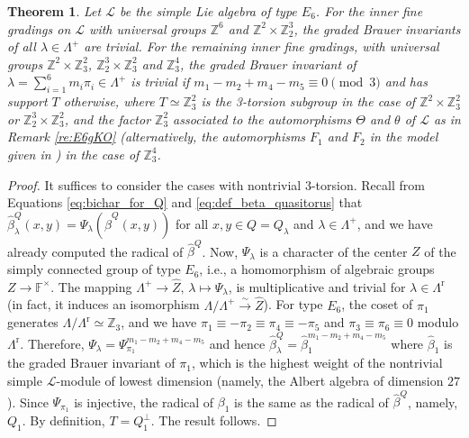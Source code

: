 \documentclass[a4paper,reqno]{amsart}
\newtheorem{theorem}{Theorem}
\theoremstyle{definition}
\numberwithin{theorem}{section}
\numberwithin{equation}{section}
\begin{document}
\begin{theorem}\label{th:E6_inner}
Let ${\mathcal{L}}$ be the simple Lie algebra of type $E_6$. For the inner fine gradings on ${\mathcal{L}}$ with universal groups ${\mathbb{Z}}^6$ and ${\mathbb{Z}}^2\times{\mathbb{Z}}_2^3$, the graded Brauer invariants of all $\lambda\in\Lambda^+$ are trivial. For the remaining inner fine gradings, with universal groups ${\mathbb{Z}}^2\times{\mathbb{Z}}_3^2$, ${\mathbb{Z}}_2^3\times{\mathbb{Z}}_3^2$ and ${\mathbb{Z}}_3^4$, the graded Brauer invariant of $\lambda=\sum_{i=1}^6 m_i{\pi}_i\in\Lambda^+$ is trivial if $m_1-m_2+m_4-m_5\equiv 0\pmod{3}$ and has support $T$ otherwise, where $T\simeq{\mathbb{Z}}_3^2$ is the 3-torsion subgroup in the case of ${\mathbb{Z}}^2\times{\mathbb{Z}}_3^2$ or ${\mathbb{Z}}_2^3\times{\mathbb{Z}}_3^2$, and the factor ${\mathbb{Z}}_3^2$ associated to the automorphisms $\Theta$ and $\theta$ of ${\mathcal{L}}$ as in Remark \ref{re:E6gKO} (alternatively, the automorphisms $F_1$ and $F_2$ in the model given in \cite{DV_E6}) in the case of ${\mathbb{Z}}_3^4$.
\end{theorem}

\begin{proof}
It suffices to consider the cases with nontrivial $3$-torsion. Recall from Equations \eqref{eq:bichar_for_Q} and \eqref{eq:def_beta_quasitorus} that $\hat{\beta}^Q_\lambda(x,y)=\Psi_\lambda(\hat{\beta}^Q(x,y))$ for all $x,y\in Q=Q_\lambda$ and $\lambda\in\Lambda^+$, and we have already computed the radical of $\hat{\beta}^Q$. Now, $\Psi_\lambda$ is a character of the center $Z$ of the simply connected group of type $E_6$, i.e., a homomorphism of algebraic groups $Z\to{\mathbb{F}}^\times$. The mapping $\Lambda^+\to{\widehat{{Z}}},\,\lambda\mapsto\Psi_\lambda$, is multiplicative and trivial for $\lambda\in\Lambda^\mathrm{r}$ 
(in fact, it induces an isomorphism $\Lambda/\Lambda^+\stackrel{\sim}{\longrightarrow}{\widehat{{Z}}}$). 
For type $E_6$, the coset of ${\pi}_1$ generates $\Lambda/\Lambda^\mathrm{r}\simeq{\mathbb{Z}}_3$, and we have ${\pi}_1\equiv-{\pi}_2\equiv{\pi}_4\equiv-{\pi}_5$ and ${\pi}_3\equiv{\pi}_6\equiv 0$ modulo $\Lambda^\mathrm{r}$. Therefore, $\Psi_\lambda=\Psi_{{\pi}_1}^{m_1-m_2+m_4-m_5}$ and hence $\hat{\beta}^Q_\lambda=\hat{\beta}_1^{m_1-m_2+m_4-m_5}$ where $\hat{\beta}_1$ is the graded Brauer invariant of ${\pi}_1$, which is the highest weight of the nontrivial simple ${\mathcal{L}}$-module of lowest dimension (namely, the Albert algebra of dimension $27$). Since $\Psi_{{\pi}_1}$ is injective, the radical of $\beta_1$ is the same as the radical of $\hat{\beta}^Q$, namely, $Q_1$. By definition, $T=Q_1^\perp$. The result follows.
\end{proof}
\end{document}
